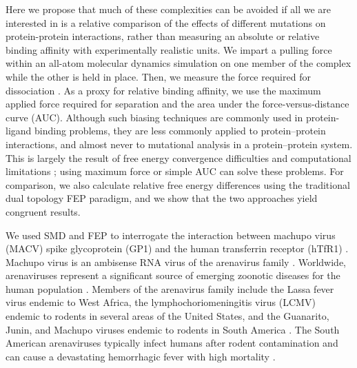 \documentclass[12pt]{article}
\begin{document}
Here we propose that much of these complexities can be avoided if all we are interested in is a relative comparison of the effects of different mutations on protein-protein interactions, rather than measuring an absolute or relative binding affinity with experimentally realistic units. We impart a pulling force within an all-atom molecular dynamics simulation on one member of the complex while the other is held in place. Then, we measure the force required for dissociation \citep{Gumbart2012,Lu1999,Park2004,Is2001A,Is2001B}. As a proxy for relative binding affinity, we use the maximum applied force required for separation and the area under the force-versus-distance curve (AUC). Although such biasing techniques are commonly used in protein-ligand binding problems, they are less commonly applied to protein--protein interactions, and almost never to mutational analysis in a protein--protein system. This is largely the result of free energy convergence difficulties and computational limitations \citep{Cuendet2008,Cuendet2011}; using maximum force or simple AUC can solve these problems. For comparison, we also calculate relative free energy differences using the traditional dual topology FEP paradigm, and we show that the two approaches yield congruent results.

We used SMD and FEP to interrogate the interaction between machupo virus (MACV) spike glycoprotein (GP1) and the human transferrin receptor (hTfR1) \citep{Abraham2010,Charrel2003}. Machupo virus is an ambisense RNA virus of the arenavirus family \citep{Charrel2003}. Worldwide, arenaviruses represent a significant source of emerging zoonotic diseases for the human population \citep{Charrel2003}. Members of the arenavirus family include the Lassa fever virus endemic to West Africa, the lymphochoriomeningitis virus (LCMV) endemic to rodents in several areas of the United States, and the Guanarito, Junin, and Machupo viruses endemic to rodents in South America \citep{Charrel2003}. The South American arenaviruses typically infect humans after rodent contamination and can cause a devastating hemorrhagic fever with high mortality \citep{Charrel2003}.
\end{document}
